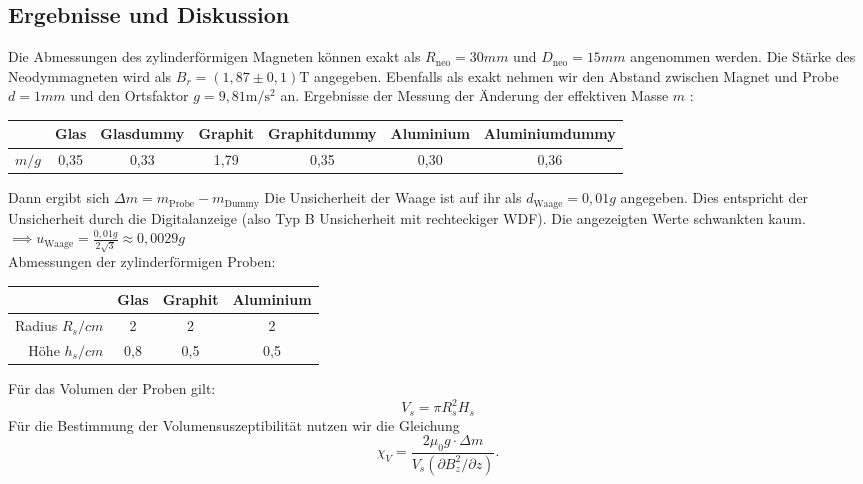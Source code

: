 \documentclass[
	a4paper,
	12pt,
	pagesize,
	ngerman
]{scrartcl}
\begin{document}
	\subsection{Ergebnisse und Diskussion}
	Die Abmessungen des zylinderförmigen Magneten können exakt als $R_\text{neo}=30 \si{mm}$ und $D_\text{neo}=15 \si{mm}$ angenommen werden. Die Stärke des Neodymmagneten wird als $B_r = (1,87 \pm 0,1 ) \si{\tesla}$ angegeben. Ebenfalls als exakt nehmen wir den Abstand zwischen Magnet und Probe $d=1\si{mm}$ und den Ortsfaktor $g=9,81\si{\meter \per \second \squared}$ an. 
	\newline
	Ergebnisse der Messung der Änderung der effektiven Masse $m$ : \newline
	\begin{tabular}{ r | c | c | c | c | c | c}
		 & Glas & Glasdummy & Graphit & Graphitdummy & Aluminium & Aluminiumdummy\\ \hline
		$m  \si{/g}$ & 0,35 &0,33 &1,79 & 0,35 & 0,30 & 0,36\\
	\end{tabular}
	\newline
	Dann ergibt sich $\Delta m = m_{\text{Probe}} -m_{\text{Dummy}}$ \newline
	Die Unsicherheit der Waage ist auf ihr als $d_\text{Waage}=0,01 \si{g}$ angegeben. Dies entspricht der Unsicherheit durch die Digitalanzeige (also Typ B Unsicherheit mit rechteckiger WDF). Die angezeigten Werte schwankten kaum. \\
	$\implies u_\text{Waage}=\frac{0,01 \si{g}}{2\sqrt{3}} \approx 0,0029 \si{g}$\\
	Abmessungen der zylinderförmigen Proben: \newline
	\begin{tabular}{ r | c | c | c}
		& Glas & Graphit & Aluminium \\ \hline
		Radius $R_s \si{/cm}$ & 2 & 2 & 2\\
		Höhe $h_s \si{/cm}$ & 0,8 & 0,5 & 0,5\\
	\end{tabular} \newline
	Für das Volumen der Proben gilt:
	\begin{equation}
		\label{Volumen_Zylinder}
		V_s=\pi R_s^2 H_s
	\end{equation}
	Für die Bestimmung der Volumensuszeptibilität nutzen wir die Gleichung
	\begin{equation}
	\label{Suzeptibilitaet}
	\chi_V=\frac{2 \mu_0 g \cdot \Delta m}{V_s(\partial B_z^2 /\partial z)}.
	\end{equation}
\end{document}
